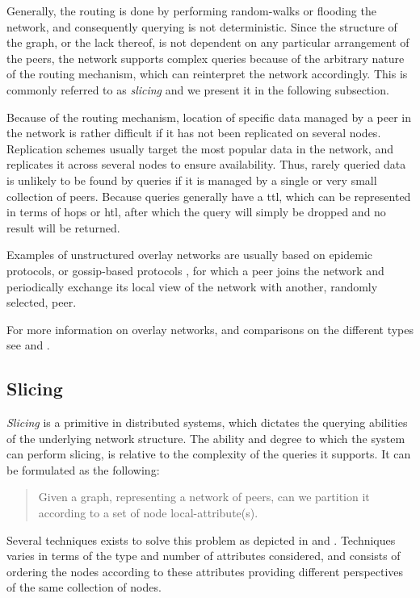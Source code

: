 \documentclass[12pt, titlepage]{uo_temp}
\begin{document}
     Generally, the routing is done by performing random-walks or flooding the network,
     and consequently querying is not deterministic. Since the structure of the graph, or
     the lack thereof, is not dependent on any particular arrangement of the peers, the
     network supports complex queries because of the arbitrary nature of the routing
     mechanism, which can reinterpret the network accordingly. This is commonly referred
     to as \emph{slicing} and we present it in the following subsection.

     Because of the routing mechanism, location of specific data managed by a peer in
     the network is rather difficult if it has not been replicated on several
     nodes. Replication schemes usually target the most popular data in the network, and
     replicates it across several nodes to ensure availability. Thus, rarely queried data
     is unlikely to be found by queries if it is managed by a single or very small
     collection of peers. Because queries generally have a \gls{ttl}, which
     can be represented in terms of hops or \gls{htl}, after which the query will simply be
     dropped and no result will be returned.

     Examples of unstructured overlay networks are usually based on epidemic protocols, or
     gossip-based protocols \cite{riviere2011gossip}, for which a peer joins the network
     and periodically exchange its local view of the network with another, randomly
     selected, peer.

     For more information on overlay networks, and comparisons on the different types see
     \cite{lua2005survey} and \cite{p2p_collab}.

     \subsection{Slicing}\label{bkg_slice}

     \emph{Slicing} is a primitive in distributed systems, which dictates the querying
     abilities of the underlying network structure. The ability and degree
     to which the system can perform slicing, is relative to the complexity of the queries
     it supports. It can be formulated as the following:
     \begin{quote}
       Given a graph, representing a network of peers, can we partition it according to a
       set of node local-attribute(s).
     \end{quote}
     Several techniques exists to solve this problem as depicted in
     \cite{jelasity2006ordered} and \cite{pasquet2014autonomous}. Techniques varies in
     terms of the type and number of attributes considered, and consists of ordering the
     nodes according to these attributes providing different perspectives of the same
     collection of nodes.
\end{document}
